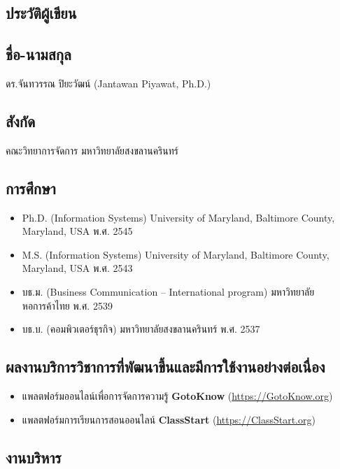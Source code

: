 \begin{appendices}

\chapter{ประวัติผู้เขียน}

\section*{ชื่อ-นามสกุล}

ดร.จันทวรรณ ปิยะวัฒน์ (Jantawan Piyawat, Ph.D.)

\section*{สังกัด}

คณะวิทยาการจัดการ มหาวิทยาลัยสงขลานครินทร์

\section*{การศึกษา}

\begin{itemize}
	\item Ph.D. (Information Systems) University of Maryland, Baltimore County, Maryland, USA พ.ศ. 2545
	\item M.S. (Information Systems) University of Maryland, Baltimore County, Maryland, USA พ.ศ. 2543
	\item บธ.ม. (Business Communication – International program) มหาวิทยาลัยหอการค้าไทย พ.ศ. 2539
	\item บธ.บ. (คอมพิวเตอร์ธุรกิจ) มหาวิทยาลัยสงขลานครินทร์ พ.ศ. 2537
\end{itemize}

\section*{ผลงานบริการวิชาการที่พัฒนาขึ้นและมีการใช้งานอย่างต่อเนื่อง}

\begin{itemize}
	\item แพลตฟอร์มออนไลน์เพื่อการจัดการความรู้ \textbf{GotoKnow} (\url{https://GotoKnow.org})
	\item แพลตฟอร์มการเรียนการสอนออนไลน์ \textbf{ClassStart} (\url{https://ClassStart.org})
\end{itemize}

\section*{งานบริหาร}


\end{appendices}
